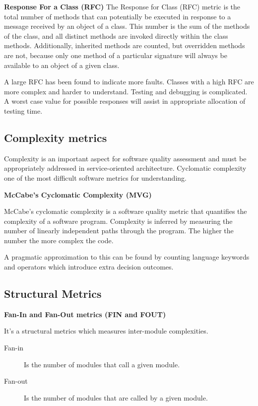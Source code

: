 \textbf{Response For a Class (RFC)} 
The Response for Class (RFC) metric is the total number of methods that can potentially be executed in response to a message received by an object of a class. This number is the sum of the methods of the class, and all distinct methods are invoked directly within the class methods. Additionally, inherited
methods are counted, but overridden methods are not, because only one method of a particular signature will always be available to an object of a given class.

A large RFC has been found to indicate more faults. Classes with a high RFC are more complex and harder to understand. Testing and debugging is complicated. A worst case value for possible responses will assist in appropriate allocation of testing time.
\subsection{Complexity metrics}
Complexity is an important aspect for software quality assessment and must be appropriately addressed in service-oriented architecture\cite{complexity}.
Cyclomatic complexity one of the most difficult software metrics for understanding.

\textbf{McCabe's Cyclomatic Complexity (MVG)}

McCabe's cyclomatic complexity is a software quality metric that quantifies the complexity of a software program. Complexity is inferred by measuring the number of linearly independent paths through the program. The higher the number the more complex the code.

A pragmatic approximation to this can be found by counting language keywords and operators which introduce extra decision outcomes.
\subsection{Structural Metrics}

\textbf{Fan-In and Fan-Out metrics (FIN and FOUT)}

It's a structural metrics which measures inter-module complexities. 
\begin{description}
	\item[Fan-in] Is the number of modules that call a given module.
	\item[Fan-out] Is the number of modules that are called by a given module.
\end{description}

